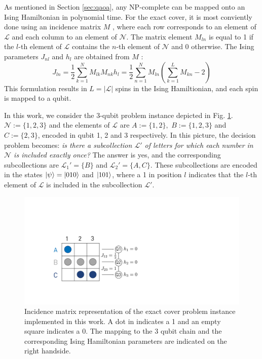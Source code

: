 As mentioned in Section \ref{sec:qaoa}, any NP-complete can be mapped onto an Ising Hamiltonian in polynomial time. For the exact cover, it is most conviently done using an incidence matrix $M$ \cite{WeissteinIncidenceMatrix}, where each row corresponds to an element of $\mathcal{L}$ and each column to an element of $\mathcal{N}$. The matrix element $M_{ln}$ is equal to 1 if the $l$-th element of $\mathcal{L}$ contains the $n$-th element of $\mathcal{N}$ and 0 otherwise.
The Ising parameters $J_{nl}$ and $h_l$ are obtained from $M$ \cite{Lucas2014IsingProblems, Vikstal2019ApplyingProblem}:
\begin{subequations}
\begin{equation}
    J_{l n}=\frac{1}{2} \sum_{k=1}^{N} M_{l k} M_{n k}
\end{equation}
\begin{equation}
h_{l}=\frac{1}{2} \sum_{n=1}^{N} M_{l n}\left(\sum_{k=1}^{L} M_{k n}-2\right)
\end{equation}
\end{subequations}
This formulation results in $L = |\mathcal{L}|$ spins in the Ising Hamiltionian, and each spin is mapped to a qubit. 

In this work, we consider the 3-qubit problem instance depicted in Fig. \ref{fig:qaoa_exact_cover_matrix}.  $\mathcal{N} := \{1,2,3\}$ and the elements of $\mathcal{L}$ are $A := \{1,2\},\,\, B := \{1,2,3\}$ and $C := \{2,3\}$, encoded in qubit 1, 2 and 3 respectively. In this picture, the decision problem becomes: \textit{is there a subcollection $\mathcal{L}'$ of letters for which each number in $\mathcal{N}$ is included exactly once?} The answer is yes, and the corresponding subcollections are $\mathcal{L}_1' = \{B\}$ and $\mathcal{L}_2' = \{A,C\}$. These subcollections are encoded in the states $\ket{\psi}=\ket{010}$ and $\ket{101}$, where a 1 in position $l$ indicates that the $l$-th element of $\mathcal{L}$ is included in the subcollection $\mathcal{L'}$.

\begin{figure}[ht]
    \centering
    \includegraphics[width=\textwidth, trim={11cm 8cm 38cm 10cm},clip]{chapters/qaoa/figs/exact_cover_matrix.pdf}
    \caption{Incidence matrix representation of the exact cover problem instance implemented in this work. A dot in indicates a 1 and an empty square indicates a 0. The mapping to the 3 qubit chain and the corresponding Ising Hamiltonian parameters are indicated on the right handside.}
    \label{fig:qaoa_exact_cover_matrix}
\end{figure}

